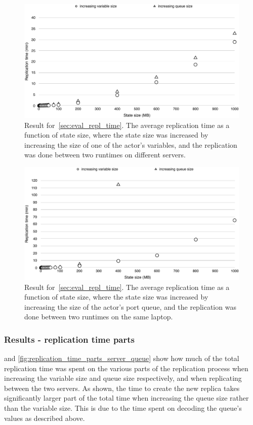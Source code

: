 \documentclass{cslthse-msc}
\begin{document}
\begin{figure}[hbt!]
\centering
\includegraphics[scale=0.5]{images/results/replication_time/server.pdf} 
\caption[Replication time in~\cref{sec:eval_repl_time}, server-server]{Result for~\cref{sec:eval_repl_time}. The average replication time as a function of state size, where the state size was increased by increasing the size of one of the actor's variables, and the replication was done between two runtimes on different servers.} \label{fig:replication_time_server}
\end{figure}

\begin{figure}[hbt!]
\centering
\includegraphics[scale=0.5]{images/results/replication_time/laptop.pdf} 
\caption[Replication time in~\cref{sec:eval_repl_time}, laptop-laptop]{Result for~\cref{sec:eval_repl_time}. The average replication time as a function of state size, where the state size was increased by increasing the size of the actor's port queue, and the replication was done between two runtimes on the same laptop.} \label{fig:replication_time_laptop}
\end{figure}

\subsubsection*{Results - replication time parts}
 and \cref{fig:replication_time_parts_server_queue} show how much of the total replication time was spent on the various parts of the replication process when increasing the variable size and queue size respectively, and when replicating between the two servers. As shown, the time to create the new replica takes significantly larger part of the total time when increasing the queue size rather than the variable size. This is due to the time spent on decoding the queue's values as described above.
\end{document}
